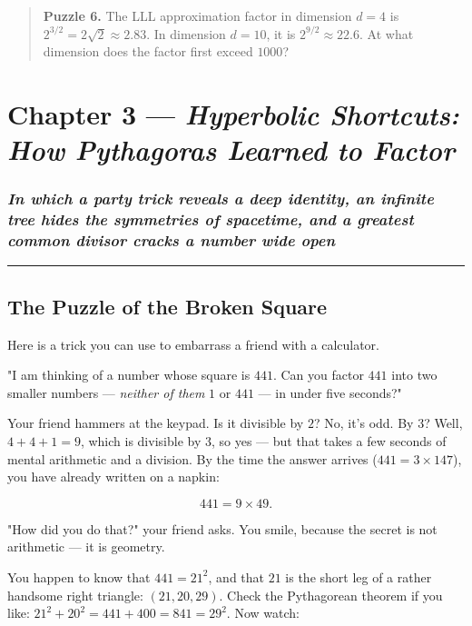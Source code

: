 \documentclass[12pt, letterpaper, openany]{book}
\theoremstyle{definition}
\theoremstyle{remark}
\begin{document}
\begin{quote}
\textbf{Puzzle 6.} The LLL approximation factor in dimension $d = 4$ is $2^{3/2} = 2\sqrt{2} \approx 2.83$. In dimension $d = 10$, it is $2^{9/2} \approx 22.6$. At what dimension does the factor first exceed $1000$?
\end{quote}



\clearpage

\chapter{Chapter 3 --- \textit{Hyperbolic Shortcuts: How Pythagoras Learned to Factor}}



\subsection*{\textit{In which a party trick reveals a deep identity, an infinite tree hides the symmetries of spacetime, and a greatest common divisor cracks a number wide open}}



\bigskip\noindent\rule{\textwidth}{0.4pt}\bigskip



\section*{The Puzzle of the Broken Square}


Here is a trick you can use to embarrass a friend with a calculator.

"I am thinking of a number whose square is $441$. Can you factor $441$ into two smaller numbers --- \textit{neither of them} $1$ or $441$ --- in under five seconds?"

Your friend hammers at the keypad. Is it divisible by $2$? No, it's odd. By $3$? Well, $4 + 4 + 1 = 9$, which is divisible by $3$, so yes --- but that takes a few seconds of mental arithmetic and a division. By the time the answer arrives ($441 = 3 \times 147$), you have already written on a napkin:

\[
441 = 9 \times 49.
\]

"How did you do that?" your friend asks. You smile, because the secret is not arithmetic --- it is geometry.

You happen to know that $441 = 21^2$, and that $21$ is the short leg of a rather handsome right triangle: $(21, 20, 29)$. Check the Pythagorean theorem if you like: $21^2 + 20^2 = 441 + 400 = 841 = 29^2$. Now watch:
\end{document}
